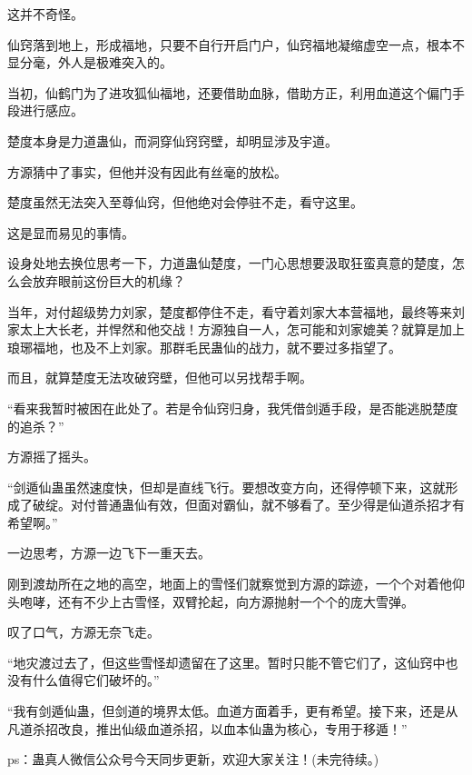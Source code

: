 \begin{this_body}
这并不奇怪。

仙窍落到地上，形成福地，只要不自行开启门户，仙窍福地凝缩虚空一点，根本不显分毫，外人是极难突入的。

当初，仙鹤门为了进攻狐仙福地，还要借助血脉，借助方正，利用血道这个偏门手段进行感应。

楚度本身是力道蛊仙，而洞穿仙窍窍壁，却明显涉及宇道。

方源猜中了事实，但他并没有因此有丝毫的放松。

楚度虽然无法突入至尊仙窍，但他绝对会停驻不走，看守这里。

这是显而易见的事情。

设身处地去换位思考一下，力道蛊仙楚度，一门心思想要汲取狂蛮真意的楚度，怎么会放弃眼前这份巨大的机缘？

当年，对付超级势力刘家，楚度都停住不走，看守着刘家大本营福地，最终等来刘家太上大长老，并悍然和他交战！方源独自一人，怎可能和刘家媲美？就算是加上琅琊福地，也及不上刘家。那群毛民蛊仙的战力，就不要过多指望了。

而且，就算楚度无法攻破窍壁，但他可以另找帮手啊。

“看来我暂时被困在此处了。若是令仙窍归身，我凭借剑遁手段，是否能逃脱楚度的追杀？”

方源摇了摇头。

“剑遁仙蛊虽然速度快，但却是直线飞行。要想改变方向，还得停顿下来，这就形成了破绽。对付普通蛊仙有效，但面对霸仙，就不够看了。至少得是仙道杀招才有希望啊。”

一边思考，方源一边飞下一重天去。

刚到渡劫所在之地的高空，地面上的雪怪们就察觉到方源的踪迹，一个个对着他仰头咆哮，还有不少上古雪怪，双臂抡起，向方源抛射一个个的庞大雪弹。

叹了口气，方源无奈飞走。

“地灾渡过去了，但这些雪怪却遗留在了这里。暂时只能不管它们了，这仙窍中也没有什么值得它们破坏的。”

“我有剑遁仙蛊，但剑道的境界太低。血道方面着手，更有希望。接下来，还是从凡道杀招改良，推出仙级血道杀招，以血本仙蛊为核心，专用于移遁！”

ps：蛊真人微信公众号今天同步更新，欢迎大家关注！(未完待续。)

\end{this_body}

